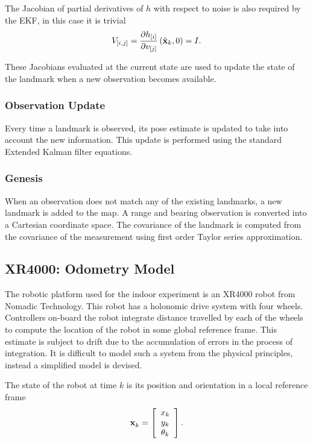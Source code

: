 The Jacobian of partial derivatives of $h$ with respect
to noise is also required by the EKF, in this case it is trivial
$$
V_{[i,j]} = \frac{\partial h_{[i]}}{\partial v_{[j]}}
             \left(\hat{\bf x}_k , 0 \right) = I.
$$

These Jacobians evaluated at the current state are used to update the
state of the landmark when a new observation becomes available.


\subsubsection{Observation Update}

Every time a landmark is observed, its pose estimate is updated to
take into account the new information. This update is performed using
the standard Extended Kalman filter equations.


\subsubsection{Genesis}

When an observation does not match any of the existing landmarks, a
new landmark is added to the map. A range and bearing observation is
converted into a Cartesian coordinate space. The covariance of the
landmark is computed from the covariance of the measurement using
first order Taylor series approximation.


\subsection{XR4000: Odometry Model}

The robotic platform used for the indoor experiment is an XR4000 robot
from Nomadic Technology. This robot has a holonomic drive system with
four wheels. Controllers on-board the robot integrate distance
travelled by each of the wheels to compute the location of the robot
in some global reference frame. This estimate is subject to drift
due to the accumulation of errors in the process of integration. It is
difficult to model such a system from the physical principles, instead
a simplified model is devised.

The state of the robot at time $k$ is its position and orientation in a
local reference frame
$$
\x{k}{}{} = \left[\begin{array}{c} 
    x_k \\ 
    y_k \\ 
    \theta_k
  \end{array}\right].
$$

